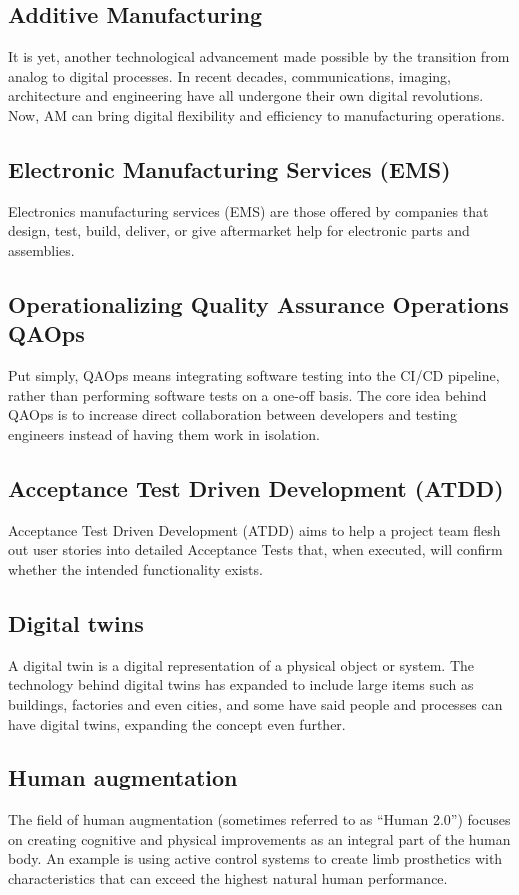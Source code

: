 \documentclass[10pt,a4paper]{article}
\begin{document}
\subsection{Additive Manufacturing}
\justifying
It is yet, another technological advancement made possible by the transition from analog to digital processes. In recent decades, communications, imaging, architecture and engineering have all undergone their own digital revolutions. Now, AM can bring digital flexibility and efficiency to manufacturing operations.
\subsection{Electronic Manufacturing Services (EMS)}
\justifying
Electronics manufacturing services (EMS) are those offered by companies that design, test, build, deliver, or give aftermarket help for electronic parts and assemblies. 
\subsection{Operationalizing Quality Assurance Operations QAOps}
\justifying
Put simply, QAOps means integrating software testing into the CI/CD pipeline, rather than performing software tests on a one-off basis. The core idea behind QAOps is to increase direct collaboration between developers and testing engineers instead of having them work in isolation.
\subsection{Acceptance Test Driven Development (ATDD)}
\justifying
Acceptance Test Driven Development (ATDD) aims to help a project team flesh out user stories into detailed Acceptance Tests that, when executed, will confirm whether the intended functionality exists.
\subsection{Digital twins}
\justifying
A digital twin is a digital representation of a physical object or system. The technology behind digital twins has expanded to include large items such as buildings, factories and even cities, and some have said people and processes can have digital twins, expanding the concept even further.
\subsection{Human augmentation}
\justifying
The field of human augmentation (sometimes referred to as “Human 2.0”) focuses on creating cognitive and physical improvements as an integral part of the human body. An example is using active control systems to create limb prosthetics with characteristics that can exceed the highest natural human performance.
\end{document}

